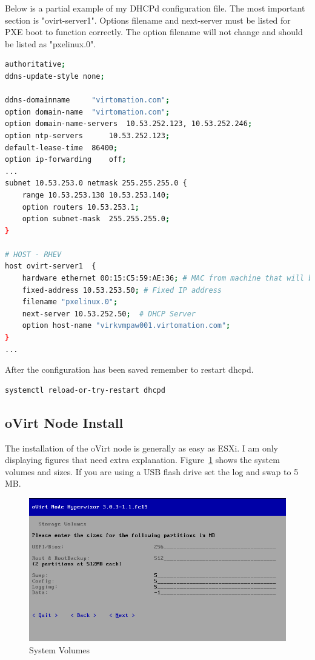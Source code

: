 \documentclass[11pt,letterpaper,oneside]{book}
\begin{document}
Below is a partial example of my DHCPd configuration file.  The most important section is "ovirt-server1". Options filename and next-server must be listed for PXE boot to function correctly.  The option filename will not change and should be listed as "pxelinux.0".
\begin{lstlisting}[caption={Example DHCPd configuration},language=bash]
authoritative;
ddns-update-style none;

ddns-domainname		"virtomation.com";
option domain-name 	"virtomation.com";
option domain-name-servers	10.53.252.123, 10.53.252.246;
option ntp-servers		10.53.252.123;
default-lease-time	86400;
option ip-forwarding	off;
...
subnet 10.53.253.0 netmask 255.255.255.0 {
	range 10.53.253.130 10.53.253.140;
	option routers 10.53.253.1;
	option subnet-mask	255.255.255.0;
}

# HOST - RHEV
host ovirt-server1  {
	hardware ethernet 00:15:C5:59:AE:36; # MAC from machine that will boot via PXE
	fixed-address 10.53.253.50; # Fixed IP address
	filename "pxelinux.0";
	next-server 10.53.252.50;  # DHCP Server
	option host-name "virkvmpaw001.virtomation.com";
}
...
\end{lstlisting}
After the configuration has been saved remember to restart dhcpd.
\begin{lstlisting}[caption={Restart DHCPd},language=bash]
systemctl reload-or-try-restart dhcpd
\end{lstlisting}
\subsection{oVirt Node Install}
The installation of the oVirt node is generally as easy as ESXi.  I am only displaying figures that need extra explanation.  Figure~\ref{fig:ovirt_04} shows the system volumes and sizes.  If you are using a USB flash drive set the log and swap to 5 MB.

\begin{figure}[ht]
	\caption{System Volumes}
	\centering
	\label{fig:ovirt_04}
	\includegraphics[scale=0.40]{./pictures/ovirt_006.png}
\end{figure}
\end{document}
